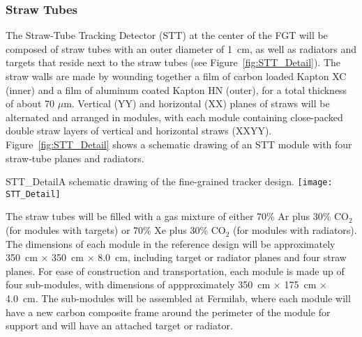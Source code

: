 \subsubsection{Straw Tubes} 
\label{cdrsec:detectors-nd-ref-fgt-stt}

The Straw-Tube Tracking Detector (STT) at the center of the FGT 
will be composed of straw tubes with an outer diameter of 1~cm, as well as 
radiators and targets that reside next to the straw tubes (see Figure~\ref{fig:STT_Detail}).
The straw walls are made by wounding together a film of carbon loaded Kapton XC (inner) and 
a film of aluminum coated Kapton HN (outer), for a total thickness of about 70 $\mu$m. 
Vertical (YY) and horizontal (XX) planes of straws will be alternated and 
arranged in modules, with each module containing close-packed double straw layers 
of vertical and horizontal straws (XXYY). 
Figure~\ref{fig:STT_Detail} shows a schematic drawing of an STT module with four straw-tube planes and
radiators. 

\begin{cdrfigure}{STT_Detail}{A schematic drawing of the fine-grained tracker design.}
\texttt{[image: STT\_Detail]}
\end{cdrfigure}




The straw tubes will be filled with a
gas mixture of either 70\% Ar plus 30\% CO$_2$ (for modules with targets) or
70\% Xe plus 30\% CO$_2$ (for modules with radiators). 
The dimensions of each module in the reference design will
be approximately 350~cm $\times$ 350~cm $\times$ 8.0~cm, including 
target or radiator planes and four straw planes. For ease of construction and
transportation, each module is made up of four sub-modules, with dimensions of
appproximately 350~cm $\times$ 175~cm $\times$ 4.0~cm. 
The sub-modules will be assembled %
at Fermilab, where each module will have a new carbon composite frame around 
the perimeter of the module for support and will have an attached target or 
radiator. 


